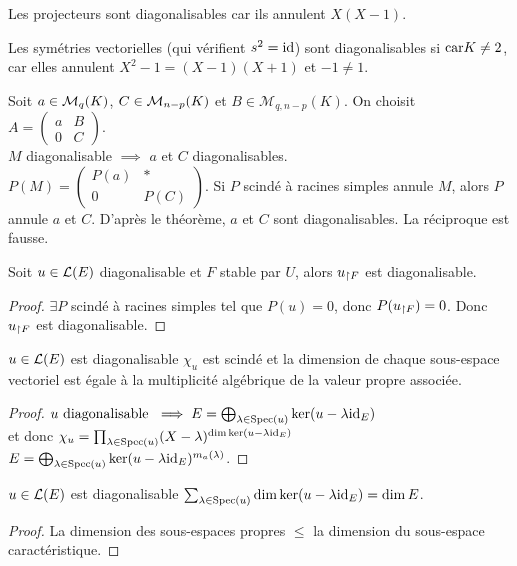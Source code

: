 \begin{example}
	Les projecteurs sont diagonalisables car ils annulent $X(X-1)$.

	Les symétries vectorielles (qui vérifient $s^2 = \text{id}$) sont diagonalisables
	si $\text{car} K \neq 2$, car elles annulent $X^2 - 1 = (X-1)(X+1)$ et $-1 \neq 1$.
\end{example}


\begin{example}
	Soit $a \in \mathcal{M}_{q}(K)$, $C \in \mathcal{M}_{n-p}(K)$ et $B \in \mathcal{M}_{q, n-p}(K)$. %
	On choisit $A = \begin{pmatrix} a & B \\ 0 & C \end{pmatrix}$.\\
	$M$ diagonalisable $\implies$ $a$ et $C$ diagonalisables.\\
	$P(M) = \begin{pmatrix} P(a) & * \\ 0 & P(C) \end{pmatrix}$. Si $P$ scindé à racines simples annule $M$, alors $P$ annule $a$ et $C$.
	D'après le théorème, $a$ et $C$ sont diagonalisables.
	La réciproque est fausse.
\end{example}


\begin{prop}
	Soit $u \in \mathcal{L}(E)$ diagonalisable et $F$ stable par $U$, alors $u_{\restriction F} $ est diagonalisable.
\end{prop}

\begin{proof}
	$\exists P$ scindé à racines simples tel que $P(u) = 0$, donc $P(u_{\restriction F}) = 0$. Donc $u_{\restriction F}$ est diagonalisable.
\end{proof}


\begin{theorem}
	$u \in \mathcal{L}(E)$ est diagonalisable \ssi $\chi_u$ est scindé et la dimension de chaque sous-espace vectoriel est égale à la multiplicité
	algébrique de la valeur propre associée.
\end{theorem}

\begin{proof}
	$u \text{ diagonalisable } \implies E = \bigoplus_{\lambda \in \text{Spec}(u)} \ker(u - \lambda \text{id}_E)$\\
	et donc $\chi_u = \prod_{\lambda \in \text{Spec}(u)} (X - \lambda)^{\dim \ker(u - \lambda \text{id}_E)}$\\
	$E = \bigoplus_{\lambda \in \text{Spec}(u)} \ker(u - \lambda \text{id}_E)^{m_a(\lambda)}$.

\end{proof}


\begin{coro}
	$u \in \mathcal{L}(E)$ est diagonalisable \ssi $\sum_{\lambda \in \text{Spec}(u)} \dim \ker(u - \lambda \text{id}_E) = \dim E$.
\end{coro}

\begin{proof}
	La dimension des sous-espaces propres $\leq$ la dimension du sous-espace caractéristique. %
\end{proof}

